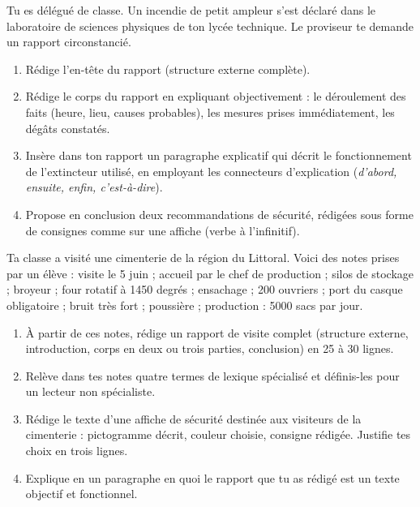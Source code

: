 \documentclass[11pt]{article}
\begin{document}
\begin{exercice}
Tu es délégué de classe. Un incendie de petit ampleur s'est déclaré dans le laboratoire de sciences physiques de ton lycée technique. Le proviseur te demande un rapport circonstancié.
\begin{enumerate}
\item Rédige l'en-tête du rapport (structure externe complète).
\item Rédige le corps du rapport en expliquant objectivement : le déroulement des faits (heure, lieu, causes probables), les mesures prises immédiatement, les dégâts constatés.
\item Insère dans ton rapport un paragraphe explicatif qui décrit le fonctionnement de l'extincteur utilisé, en employant les connecteurs d'explication (\emph{d'abord, ensuite, enfin, c'est-à-dire}).
\item Propose en conclusion deux recommandations de sécurité, rédigées sous forme de consignes comme sur une affiche (verbe à l'infinitif).
\end{enumerate}
\end{exercice}

\begin{exercice}
Ta classe a visité une cimenterie de la région du Littoral. Voici des notes prises par un élève : \og visite le 5 juin ; accueil par le chef de production ; silos de stockage ; broyeur ; four rotatif à 1450 degrés ; ensachage ; 200 ouvriers ; port du casque obligatoire ; bruit très fort ; poussière ; production : 5000 sacs par jour. \fg
\begin{enumerate}
\item À partir de ces notes, rédige un rapport de visite complet (structure externe, introduction, corps en deux ou trois parties, conclusion) en 25 à 30 lignes.
\item Relève dans tes notes quatre termes de lexique spécialisé et définis-les pour un lecteur non spécialiste.
\item Rédige le texte d'une affiche de sécurité destinée aux visiteurs de la cimenterie : pictogramme décrit, couleur choisie, consigne rédigée. Justifie tes choix en trois lignes.
\item Explique en un paragraphe en quoi le rapport que tu as rédigé est un texte objectif et fonctionnel.
\end{enumerate}
\end{exercice}
\end{document}
